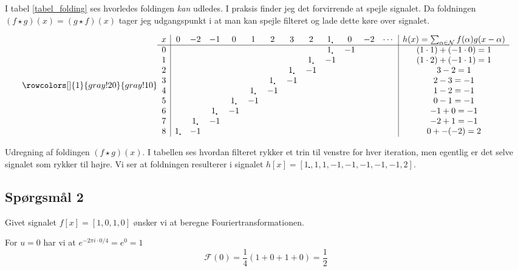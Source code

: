 \documentclass[a4paper, 10pt, danish, final]{article}
\begin{document}
I tabel \ref{tabel_folding} ses hvorledes foldingen
\emph{kan} udledes. I praksis finder jeg det forvirrende at spejle
signalet. Da foldningen $(f \star g)(x) = (g \star f)(x)$ tager jeg
udgangspunkt i at man kan spejle filteret og lade dette køre over
signalet.

\begin{table}
    \begin{equation}
        \rowcolors[]{1}{gray!20}{gray!10}
        \begin{array}{c|cccccccccccc|c}
            x & 0 & -2 & -1 & 0 & 1 & 2 & 3 & 2 & 1_{\centerdot} & 0 & -2 & \cdots & h(x) = \sum_{\alpha \in \mathcal{N}}f(\alpha)g(x - \alpha)\\\hline
            0&&&&&&&&&1_\centerdot & -1 &&& (1\cdot 1) + (-1 \cdot 0) = 1\\
            1&&&&&&&&1_\centerdot & -1 &&&& (1\cdot 2) + (-1 \cdot 1) = 1\\
            2&&&&&&&1_\centerdot & -1 &&&&& 3 - 2 = 1\\
            3&&&&&&1_\centerdot & -1 &&&&&& 2 - 3 = -1\\
            4&&&&&1_\centerdot & -1 &&&&&&& 1 - 2 = -1\\
            5&&&&1_\centerdot & -1 &&&&&&&& 0 - 1 = -1\\
            6&&&1_\centerdot & -1 &&&&&&&&& -1 + 0 = -1\\
            7&&1_\centerdot & -1 &&&&&&&&&& -2 + 1 = -1\\
            8&1_\centerdot & -1 &&&&&&&&&&& 0 + -(-2) = 2
        \end{array}\nonumber
    \end{equation}
    \caption{Udregning af foldingen $(f \star g)(x)$. I tabellen ses
    hvordan filteret rykker et trin til venstre for hver iteration, men
    egentlig er det selve signalet som rykker til højre. Vi ser at
    foldningen resulterer i signalet $h[x] = [1_\centerdot, 1, 1, -1,
    -1, -1, -1, -1,
    2]$.}
    \label{tabel_folding}
\end{table}

\subsection*{Spørgsmål 2}
Givet signalet $f[x] = [1, 0, 1, 0]$ ønsker vi at beregne
Fouriertransformationen.

For $u = 0$ har vi at $e^{-2\pi i \cdot 0/4} = e^{0} = 1$
\begin{equation}
    \mathcal{F}(0) = \frac{1}{4}(1 + 0 + 1 + 0) = \frac{1}{2}
\end{equation}
\end{document}

